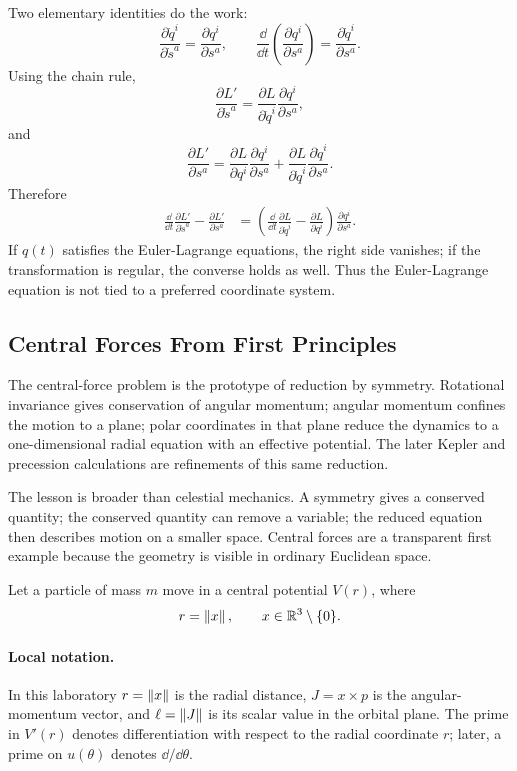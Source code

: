 Two elementary identities do the work:
\[
  \frac{\partial \dot q^i}{\partial \dot s^a}
  =
  \frac{\partial q^i}{\partial s^a},
  \qquad
  \frac{\dd}{\dd t}
  \left(
    \frac{\partial q^i}{\partial s^a}
  \right)
  =
  \frac{\partial \dot q^i}{\partial s^a}.
\]
Using the chain rule,
\[
  \frac{\partial L'}{\partial \dot s^a}
  =
  \frac{\partial L}{\partial \dot q^i}
  \frac{\partial q^i}{\partial s^a},
\]
and
\[
  \frac{\partial L'}{\partial s^a}
  =
  \frac{\partial L}{\partial q^i}
  \frac{\partial q^i}{\partial s^a}
  +
  \frac{\partial L}{\partial \dot q^i}
  \frac{\partial \dot q^i}{\partial s^a}.
\]
Therefore
\[
\begin{aligned}
  \frac{\dd}{\dd t}\frac{\partial L'}{\partial \dot s^a}
  -
  \frac{\partial L'}{\partial s^a}
  &=
  \left(
    \frac{\dd}{\dd t}\frac{\partial L}{\partial\dot q^i}
    -
    \frac{\partial L}{\partial q^i}
  \right)
  \frac{\partial q^i}{\partial s^a}.
\end{aligned}
\]
If \(q(t)\) satisfies the Euler-Lagrange equations, the right side vanishes;
if the transformation is regular, the converse holds as well. Thus the
Euler-Lagrange equation is not tied to a preferred coordinate system.

\subsection{Central Forces From First Principles}
\label{sec:detailed-central-forces}

The central-force problem is the prototype of reduction by symmetry. Rotational
invariance gives conservation of angular momentum; angular momentum confines
the motion to a plane; polar coordinates in that plane reduce the dynamics to a
one-dimensional radial equation with an effective potential. The later Kepler
and precession calculations are refinements of this same reduction.

The lesson is broader than celestial mechanics. A symmetry gives a conserved
quantity; the conserved quantity can remove a variable; the reduced equation
then describes motion on a smaller space. Central forces are a transparent first
example because the geometry is visible in ordinary Euclidean space.

Let a particle of mass \(m\) move in a central potential \(V(r)\), where
\[
  r=\left\lVert x\right\rVert,
  \qquad
  x\in\mathbb{R}^3\setminus\{0\}.
\]

\paragraph{Local notation.}
In this laboratory \(r=\left\lVert x\right\rVert\) is the radial distance, \(J=x\times p\) is
the angular-momentum vector, and \(\ell=\left\lVert J\right\rVert\) is its scalar value in the
orbital plane.  The prime in \(V'(r)\) denotes differentiation with respect to
the radial coordinate \(r\); later, a prime on \(u(\theta)\) denotes
\(\dd/\dd\theta\).

